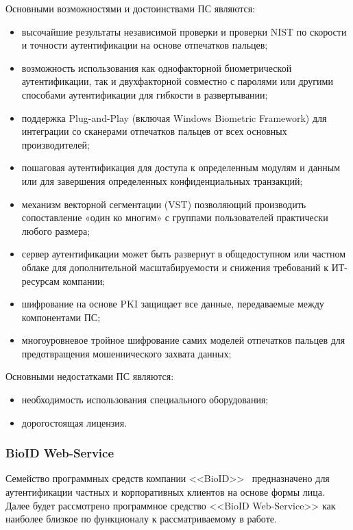 Основными возможностями и достоинствами ПС являются:
\begin{itemize}
  \item высочайшие результаты независимой проверки и проверки NIST по скорости и точности аутентификации на основе отпечатков пальцев;
  \item возможность использования как однофакторной биометрической аутентификации, так и двухфакторной совместно с паролями или другими способами аутентификации для гибкости в развертывании;
  \item поддержка Plug-and-Play (включая Windows Biometric Framework) для интеграции со сканерами отпечатков пальцев от всех основных производителей;
  \item пошаговая аутентификация для доступа к определенным модулям и данным или для завершения определенных конфиденциальных транзакций;
  \item механизм векторной сегментации (VST) позволяющий производить сопоставление «один ко многим» с группами пользователей практически любого размера;
  \item сервер аутентификации может быть развернут в общедоступном или частном облаке для дополнительной масштабируемости и снижения требований к ИТ-ресурсам компании;
  \item шифрование на основе PKI защищает все данные, передаваемые между компонентами ПС;
  \item многоуровневое тройное шифрование самих моделей отпечатков пальцев для предотвращения мошеннического захвата данных;
\end{itemize}

Основными недостатками ПС являются:
\begin{itemize}
  \item необходимость использования специального оборудования;
  \item дорогостоящая лицензия.
\end{itemize}

\subsubsection{BioID Web-Service}
\label{sub:domain:analogs:bioId}
Семейство программных средств компании <<BioID>>~\cite{analogs_bioid} предназначено для аутентификации частных и корпоративных клиентов на основе формы лица. Далее будет рассмотрено программное средство <<BioID Web-Service>> как наиболее близкое по функционалу к рассматриваемому в работе.

